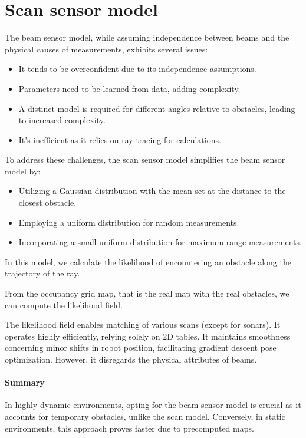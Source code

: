 \section{Scan sensor model}

The beam sensor model, while assuming independence between beams and the physical causes of measurements, exhibits several issues:
\begin{itemize}
    \item It tends to be overconfident due to its independence assumptions.
    \item Parameters need to be learned from data, adding complexity.
    \item A distinct model is required for different angles relative to obstacles, leading to increased complexity.
    \item It's inefficient as it relies on ray tracing for calculations.
\end{itemize}
To address these challenges, the scan sensor model simplifies the beam sensor model by:
\begin{itemize}
    \item Utilizing a Gaussian distribution with the mean set at the distance to the closest obstacle.
    \item Employing a uniform distribution for random measurements.
    \item Incorporating a small uniform distribution for maximum range measurements.
\end{itemize}
In this model, we calculate the likelihood of encountering an obstacle along the trajectory of the ray.

From the occupancy grid map, that is the real map with the real obstacles, we can compute the likelihood field.

The likelihood field enables matching of various scans (except for sonars). 
It operates highly efficiently, relying solely on 2D tables. 
It maintains smoothness concerning minor shifts in robot position, facilitating gradient descent pose optimization.
However, it disregards the physical attributes of beams.

\paragraph*{Summary}
In highly dynamic environments, opting for the beam sensor model is crucial as it accounts for temporary obstacles, unlike the scan model. 
Conversely, in static environments, this approach proves faster due to precomputed maps.